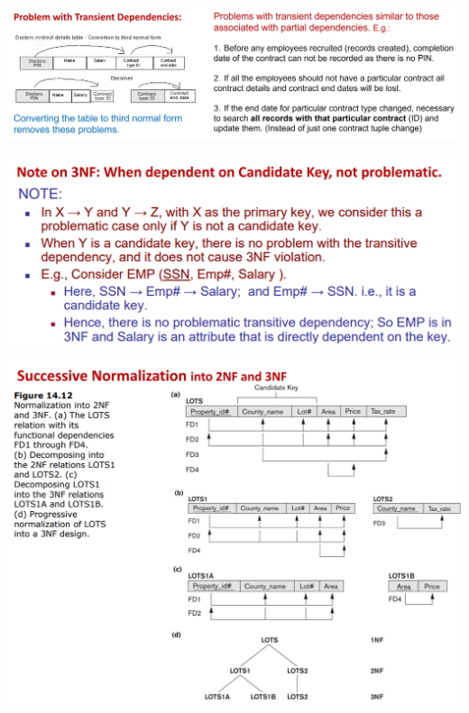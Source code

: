 \documentclass[12pt, landscape]{article}
\begin{document}
\begin{multicols*}{3}
\medskip
\centerline{\includegraphics[width = 1\linewidth]{3NF-0}}
\medskip
\centerline{\includegraphics[width = 1\linewidth]{3NF-3}}
\medskip
\centerline{\includegraphics[width = 1\linewidth]{2NF-3NF}}


\end{multicols*}
\end{document}
